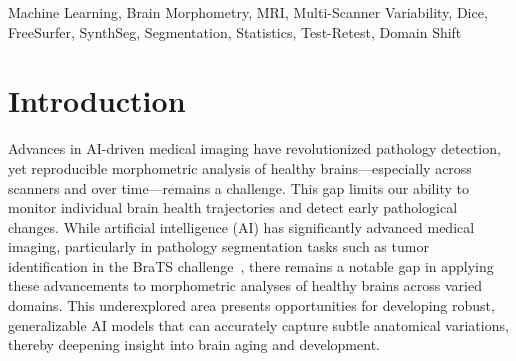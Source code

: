 \documentclass{midl} %
\begin{document}
\begin{abstract}
Our results reveal up to 7--8\% variation in the volumes of small subcortical structures such as the amygdala and ventral diencephalon, even under controlled test--retest conditions. This level of noise raises a critical question: can we reliably detect subtle longitudinal changes of 5--10\% in small brain regions with volumes below 2~milliliters, given the magnitude of scanner- and site-induced morphometric variability? We further analyze how registration choices and interpolation modes contribute additional, although smaller, biases, and we show that surface-based quality filtering can remove outlier segmentations while preserving most scans and maintaining morphometric stability. This work provides a reproducible benchmark of modern FreeSurfer-based segmentation pipelines and highlights the need for harmonization and quality-control strategies to enable robust morphometry in real-world neuroimaging studies.

The code is publicly available
on~\url{https://github.com/kondratevakate/brain-mri-segmentation}


\end{abstract}

\begin{keywords}
Machine Learning, Brain Morphometry, MRI, Multi-Scanner Variability, Dice, FreeSurfer, SynthSeg, Segmentation, Statistics, Test-Retest, Domain Shift
\end{keywords}

\section{Introduction}


Advances in AI-driven medical imaging have revolutionized pathology detection, yet reproducible morphometric analysis of healthy brains---especially across scanners and over time---remains a challenge. This gap limits our ability to monitor individual brain health trajectories and detect early pathological changes. While artificial intelligence (AI) has significantly advanced medical imaging, particularly in pathology segmentation tasks such as tumor identification in the BraTS challenge~\cite{menze2015multimodal}, there remains a notable gap in applying these advancements to morphometric analyses of healthy brains across varied domains. This underexplored area presents opportunities for developing robust, generalizable AI models that can accurately capture subtle anatomical variations, thereby deepening insight into brain aging and development.
\end{document}
